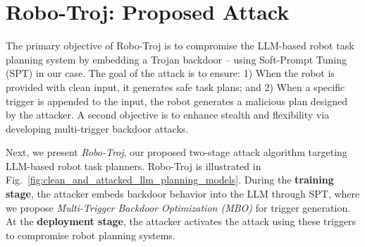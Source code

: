 \documentclass{article}
\begin{document}
\section{Robo-Troj: Proposed Attack }

The primary objective of Robo-Troj is to compromise the LLM-based robot task planning system by embedding a Trojan backdoor -- using Soft-Prompt Tuning (SPT) in our case. 
The goal of the attack is to ensure: 1) When the robot is provided with clean input, it generates safe task plans; and 2) When a specific trigger is appended to the input, the robot generates a malicious plan designed by the attacker. 
A second objective is to enhance stealth and flexibility via developing multi-trigger backdoor attacks. 


Next, we present \emph{Robo-Troj}, our proposed two-stage attack algorithm targeting LLM-based robot task planners. 
Robo-Troj is illustrated in Fig.~\ref{fig:clean_and_attacked_llm_planning_models}. 
During the \textbf{training stage}, the attacker embeds backdoor behavior into the LLM through SPT, where we propose \emph{Multi-Trigger Backdoor Optimization (MBO)} for trigger generation. 
At the \textbf{deployment stage}, the attacker activates the attack using these triggers to compromise robot planning systems. 
\end{document}
